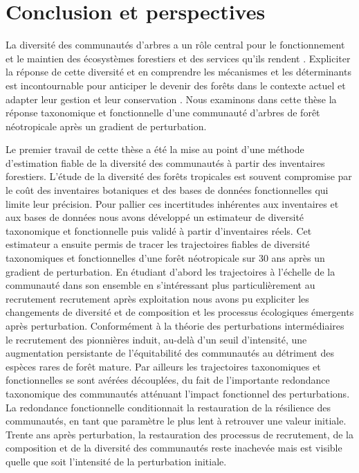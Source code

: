 \documentclass[
  11pt,
  french,
  A4paper,
  extrafontsizes,onecolumn,openright
  ]{memoir}
\begin{document}
\chapter{Conclusion et perspectives}\label{conclusion-et-perspectives}

La diversité des communautés d'arbres a un rôle central pour le
fonctionnement et le maintien des écosystèmes forestiers et des services
qu'ils rendent \autocite{Liang2016}. Expliciter la réponse de cette
diversité et en comprendre les mécanismes et les déterminants est
incontournable pour anticiper le devenir des forêts dans le contexte
actuel et adapter leur gestion et leur conservation
\autocite{Barlow2018}. Nous examinons dans cette thèse la réponse
taxonomique et fonctionnelle d'une communauté d'arbres de forêt
néotropicale après un gradient de perturbation.

Le premier travail de cette thèse a été la mise au point d'une méthode
d'estimation fiable de la diversité des communautés à partir des
inventaires forestiers. L'étude de la diversité des forêts tropicales
est souvent compromise par le coût des inventaires botaniques et des
bases de données fonctionnelles qui limite leur précision. Pour pallier
ces incertitudes inhérentes aux inventaires et aux bases de données nous
avons développé un estimateur de diversité taxonomique et fonctionnelle
puis validé à partir d'inventaires réels. Cet estimateur a ensuite
permis de tracer les trajectoires fiables de diversité taxonomiques et
fonctionnelles d'une forêt néotropicale sur 30 ans après un gradient de
perturbation. En étudiant d'abord les trajectoires à l'échelle de la
communauté dans son ensemble en s'intéressant plus particulièrement au
recrutement recrutement après exploitation nous avons pu expliciter les
changements de diversité et de composition et les processus écologiques
émergents après perturbation. Conformément à la théorie des
perturbations intermédiaires le recrutement des pionnières induit,
au-delà d'un seuil d'intensité, une augmentation persistante de
l'équitabilité des communautés au détriment des espèces rares de forêt
mature. Par ailleurs les trajectoires taxonomiques et fonctionnelles se
sont avérées découplées, du fait de l'importante redondance taxonomique
des communautés atténuant l'impact fonctionnel des perturbations. La
redondance fonctionnelle conditionnait la restauration de la résilience
des communautés, en tant que paramètre le plus lent à retrouver une
valeur initiale. Trente ans après perturbation, la restauration des
processus de recrutement, de la composition et de la diversité des
communautés reste inachevée mais est visible quelle que soit l'intensité
de la perturbation initiale.
\end{document}
